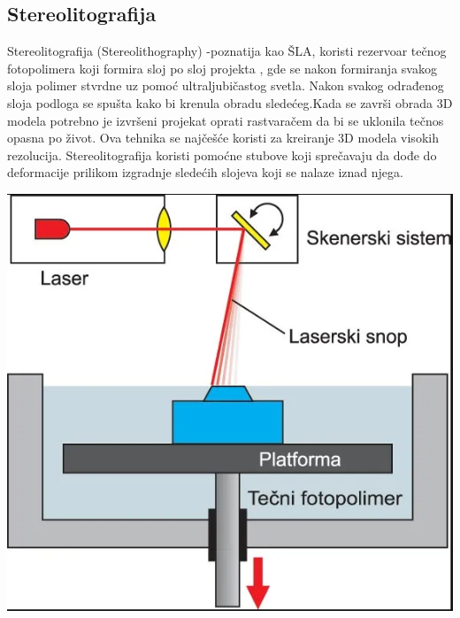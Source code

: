 \documentclass[a4paper]{article}
\begin{document}
{\subsection{Stereolitografija}
\label{subsec:podnaslov3}
Stereolitografija (Stereolithography) -poznatija kao ŠLA, koristi rezervoar tečnog fotopolimera koji formira sloj po sloj projekta , gde se nakon formiranja svakog sloja polimer stvrdne uz pomoć ultraljubičastog svetla.
\bigbreak Nakon svakog odrađenog sloja podloga se spušta kako bi krenula obradu sledećeg.Kada se završi obrada 3D modela potrebno je izvršeni projekat oprati rastvaračem da bi se uklonila tečnos opasna po život.
\bigbreak Ova tehnika se najčešće koristi za kreiranje 3D modela visokih rezolucija.  Stereolitografija koristi pomoćne stubove koji sprečavaju da dođe do deformacije prilikom izgradnje sledećih slojeva koji se nalaze iznad njega.

\begin{center}
\includegraphics[width=.5\textwidth ]{Tehnikeslike/Stereolitografija.PNG}
\end{center}

\bigbreak
\bigbreak

}
\end{document}
